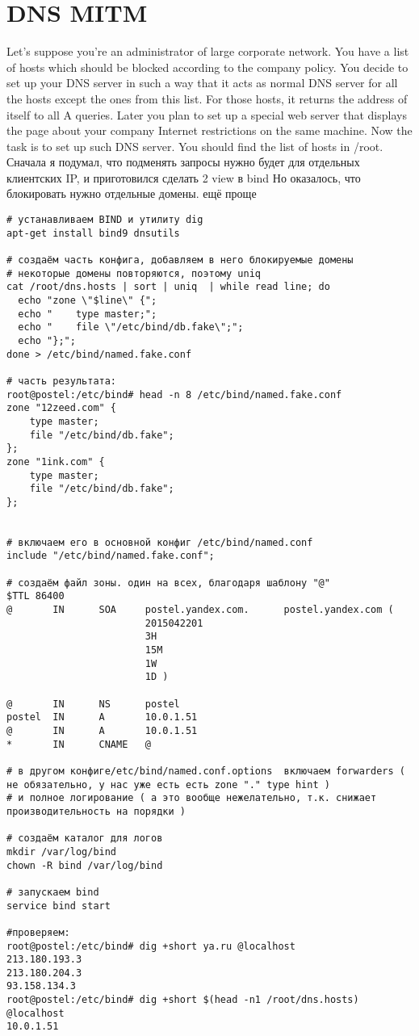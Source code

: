 \documentclass[a4paper,10pt]{report}
\begin{document}
\chapter{DNS MITM}
Let's suppose you're an administrator of large corporate network. You have a list of hosts which should be blocked according to the company policy. You decide to set up your DNS server in such a way that it acts as normal DNS server for all the hosts except the ones from this list. For those hosts, it returns the address of itself to all A queries. Later you plan to set up a special web server that displays the page about your company Internet restrictions on the same machine.
\newline
Now the task is to set up such DNS server. You should find the list of hosts in /root.
\newline\newline
Сначала я подумал, что подменять запросы нужно будет для отдельных клиентских IP, и приготовился сделать 2 view в bind
\newline
Но оказалось, что блокировать нужно отдельные домены. ещё проще
\newline
\begin{verbatim}
# устанавливаем BIND и утилиту dig
apt-get install bind9 dnsutils

# создаём часть конфига, добавляем в него блокируемые домены
# некоторые домены повторяются, поэтому uniq
cat /root/dns.hosts | sort | uniq  | while read line; do
  echo "zone \"$line\" {";
  echo "    type master;";
  echo "    file \"/etc/bind/db.fake\";";
  echo "};";
done > /etc/bind/named.fake.conf

# часть результата:
root@postel:/etc/bind# head -n 8 /etc/bind/named.fake.conf
zone "12zeed.com" {
    type master;
    file "/etc/bind/db.fake";
};
zone "1ink.com" {
    type master;
    file "/etc/bind/db.fake";
};


# включаем его в основной конфиг /etc/bind/named.conf
include "/etc/bind/named.fake.conf";

# создаём файл зоны. один на всех, благодаря шаблону "@"
$TTL 86400
@       IN      SOA     postel.yandex.com.      postel.yandex.com (
                        2015042201
                        3H
                        15M
                        1W
                        1D )

@       IN      NS      postel
postel  IN      A       10.0.1.51
@       IN      A       10.0.1.51
*       IN      CNAME   @

# в другом конфиге/etc/bind/named.conf.options  включаем forwarders ( не обязательно, у нас уже есть есть zone "." type hint )
# и полное логирование ( а это вообще нежелательно, т.к. снижает производительность на порядки )

# создаём каталог для логов
mkdir /var/log/bind
chown -R bind /var/log/bind

# запускаем bind
service bind start

#проверяем:
root@postel:/etc/bind# dig +short ya.ru @localhost
213.180.193.3
213.180.204.3
93.158.134.3
root@postel:/etc/bind# dig +short $(head -n1 /root/dns.hosts) @localhost
10.0.1.51
\end{verbatim}
\end{document}
